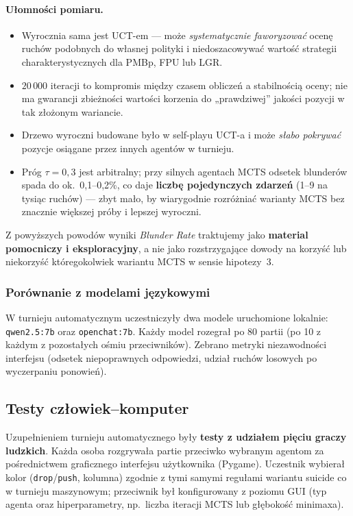 \documentclass[11pt, a4paper]{article}
\begin{document}
\paragraph{Ułomności pomiaru.}
\begin{itemize}
    \item Wyrocznia sama jest UCT-em --- może \emph{systematycznie faworyzować} ocenę ruchów podobnych do własnej polityki i niedoszacowywać wartość strategii charakterystycznych dla PMBp, FPU lub LGR.
    \item $20\,000$ iteracji to kompromis między czasem obliczeń a stabilnością oceny; nie ma gwarancji zbieżności wartości korzenia do „prawdziwej” jakości pozycji w tak złożonym wariancie.
    \item Drzewo wyroczni budowane było w self-playu UCT-a i może \emph{słabo pokrywać} pozycje osiągane przez innych agentów w turnieju.
    \item Próg $\tau = 0{,}3$ jest arbitralny; przy silnych agentach MCTS odsetek blunderów spada do ok.\ 0{,}1--0{,}2\%, co daje \textbf{liczbę pojedynczych zdarzeń} (1--9 na tysiąc ruchów) --- zbyt mało, by wiarygodnie rozróżniać warianty MCTS bez znacznie większej próby i lepszej wyroczni.
\end{itemize}

\noindent
Z powyższych powodów wyniki \textit{Blunder Rate} traktujemy jako \textbf{material pomocniczy i eksploracyjny}, a nie jako rozstrzygające dowody na korzyść lub niekorzyść któregokolwiek wariantu MCTS w sensie hipotezy~3.

\subsubsection{Porównanie z modelami językowymi}

W turnieju automatycznym uczestniczyły dwa modele uruchomione lokalnie: \texttt{qwen2.5:7b} oraz \texttt{openchat:7b}. Każdy model rozegrał po 80 partii (po 10 z każdym z pozostałych ośmiu przeciwników). Zebrano metryki niezawodności interfejsu (odsetek niepoprawnych odpowiedzi, udział ruchów losowych po wyczerpaniu ponowień).

\subsection{Testy człowiek--komputer}
\label{sec:testy-czlowiek}

Uzupełnieniem turnieju automatycznego były \textbf{testy z udziałem pięciu graczy ludzkich}. Każda osoba rozgrywała partie przeciwko wybranym agentom za pośrednictwem graficznego interfejsu użytkownika (Pygame). Uczestnik wybierał kolor (\texttt{drop}/\texttt{push}, kolumna) zgodnie z tymi samymi regułami wariantu suicide co w turnieju maszynowym; przeciwnik był konfigurowany z poziomu GUI (typ agenta oraz hiperparametry, np.\ liczba iteracji MCTS lub głębokość minimaxa).
\end{document}
